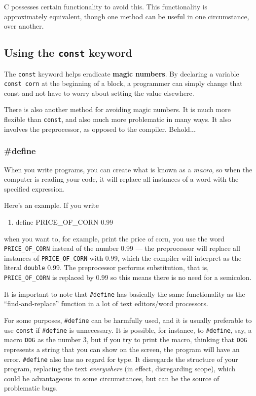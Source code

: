 C possesses certain functionality to avoid this. This functionality is
approximately equivalent, though one method can be useful in one circumstance,
over another.

\subsection{Using the \texttt{const} keyword}
The \texttt{const} keyword helps eradicate \textbf{magic numbers}. By declaring
a variable \texttt{const corn} at the beginning of a block, a programmer can
simply change that const and not have to worry about setting the value
elsewhere.

There is also another method for avoiding magic numbers. It is much more
flexible than \texttt{const}, and also much more problematic in many ways. It
also involves the preprocessor, as opposed to the compiler. Behold...

\subsubsection{\#define}
When you write programs, you can create what is known as a \emph{macro}, so
when the computer is reading your code, it will replace all instances of a word
with the specified expression.

Here's an example. If you write
\begin{enumerate}
\setlength{\leftmargin}{0pt}
\setlength{\itemsep}{0pt}
\setlength{\parsep}{0pt}
\setlength{\parskip}{0pt}
	\item define PRICE\_OF\_CORN 0.99
\end{enumerate}

when you want to, for example, print the price of corn, you use the word
\texttt{PRICE\_OF\_CORN} instead of the number 0.99 --- the preprocessor will
replace all instances of \texttt{PRICE\_OF\_CORN} with 0.99, which the compiler
will interpret as the literal \texttt{double} 0.99. The preprocessor performs
substitution, that is, \texttt{PRICE\_OF\_CORN} is replaced by 0.99 so this
means there is no need for a semicolon.

It is important to note that \texttt{\#define} has basically the same
functionality as the ``find-and-replace'' function in a lot of text
editors/word processors. 

For some purposes, \texttt{\#define} can be harmfully used, and it is usually
preferable to use \texttt{const} if \texttt{\#define} is unnecessary. It is
possible, for instance, to \texttt{\#define}, say, a macro \texttt{DOG} as the
number 3, but if you try to print the macro, thinking that \texttt{DOG}
represents a string that you can show on the screen, the program will have an
error. \texttt{\#define} also has no regard for type. It disregards the
structure of your program, replacing the text \emph{everywhere} (in effect,
disregarding scope), which could be advantageous in some circumstances, but can
be the source of problematic bugs.

